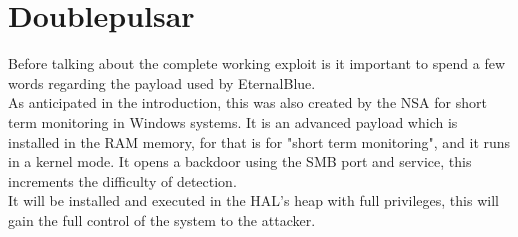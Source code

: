 \section{Doublepulsar}
Before talking about the complete working exploit is it important to spend a few words regarding the payload used by EternalBlue.\\
As anticipated in the introduction, this was also created by the NSA for short term monitoring in Windows systems.
It is an advanced payload\cite{doublepulsar} which is installed in the RAM memory, for that is for "short term monitoring", and it runs in a kernel mode. It opens a backdoor using the SMB port and service, this increments 
the difficulty of detection.\\
It will be installed and executed in the HAL's heap with full privileges, this will gain the full control of the system to the attacker.